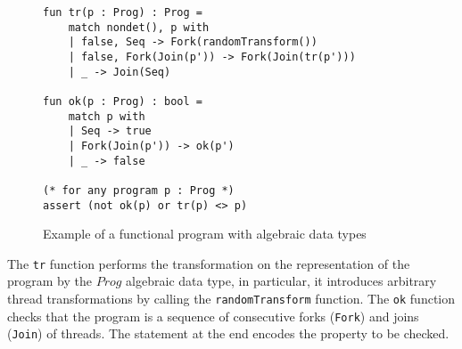 \begin{example}[$ForkJoin$]
{\begin{figure}
\begin{verbatim}
fun tr(p : Prog) : Prog =
    match nondet(), p with
    | false, Seq -> Fork(randomTransform())
    | false, Fork(Join(p')) -> Fork(Join(tr(p')))
    | _ -> Join(Seq)

fun ok(p : Prog) : bool =
    match p with
    | Seq -> true
    | Fork(Join(p')) -> ok(p')
    | _ -> false

(* for any program p : Prog *)
assert (not ok(p) or tr(p) <> p)
\end{verbatim}
    \caption{Example of a functional program with algebraic data types}
    \label{fig:ex-fork-join}
\end{figure}}

The \texttt{tr} function performs the transformation on the representation of the program by the $Prog$ algebraic data type, in particular, it introduces arbitrary thread transformations by calling the \texttt{randomTransform} function. The \texttt{ok} function checks that the program is a sequence of consecutive forks (\texttt{Fork}) and joins (\texttt{Join}) of threads. The statement at the end encodes the property to be checked.


\end{example}
